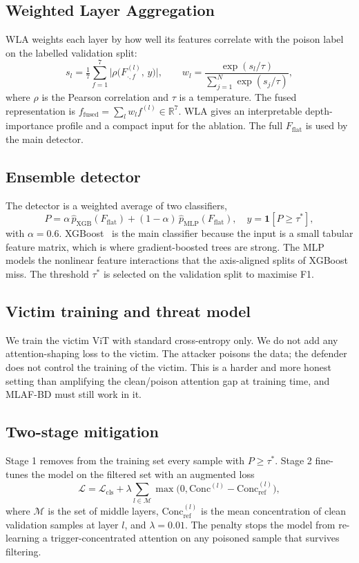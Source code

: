 \documentclass[journal]{IEEEtran}
\begin{document}
\subsection{Weighted Layer Aggregation}
WLA weights each layer by how well its features correlate with the poison label
on the labelled validation split:
\begin{equation}
s_l=\tfrac{1}{7}\textstyle\sum_{f=1}^{7}\big|\rho\big(F^{(l)}_{\cdot,f},\,y\big)\big|,
\qquad
w_l=\frac{\exp(s_l/\tau)}{\sum_{j=1}^{N}\exp(s_j/\tau)},
\end{equation}
where $\rho$ is the Pearson correlation and $\tau$ is a temperature. The fused
representation is $f_{\mathrm{fused}}=\sum_{l} w_l f^{(l)}\in\mathbb{R}^{7}$.
WLA gives an interpretable depth-importance profile and a compact input for the
ablation. The full $F_{\mathrm{flat}}$ is used by the main detector.

\subsection{Ensemble detector}
The detector is a weighted average of two classifiers,
\begin{equation}
P=\alpha\,\hat p_{\mathrm{XGB}}(F_{\mathrm{flat}})+(1-\alpha)\,\hat p_{\mathrm{MLP}}(F_{\mathrm{flat}}),\quad \hat y=\mathbf{1}[P\ge\tau^\ast],
\end{equation}
with $\alpha=0.6$. XGBoost~\cite{chen2016xgboost} is the main classifier because
the input is a small tabular feature matrix, which is where gradient-boosted
trees are strong. The MLP models the nonlinear feature interactions that the
axis-aligned splits of XGBoost miss. The threshold $\tau^\ast$ is selected on
the validation split to maximise F1.

\subsection{Victim training and threat model}
We train the victim ViT with standard cross-entropy only. We do not add any
attention-shaping loss to the victim. The attacker poisons the data; the
defender does not control the training of the victim. This is a harder and more
honest setting than amplifying the clean/poison attention gap at training time,
and MLAF-BD must still work in it.

\subsection{Two-stage mitigation}
Stage 1 removes from the training set every sample with $P\ge\tau^\ast$. Stage 2
fine-tunes the model on the filtered set with an augmented loss
\begin{equation}
\mathcal{L}=\mathcal{L}_{\mathrm{cls}}+\lambda\textstyle\sum_{l\in\mathcal{M}}\max\!\big(0,\mathrm{Conc}^{(l)}-\mathrm{Conc}^{(l)}_{\mathrm{ref}}\big),
\end{equation}
where $\mathcal{M}$ is the set of middle layers, $\mathrm{Conc}^{(l)}_{\mathrm{ref}}$
is the mean concentration of clean validation samples at layer $l$, and
$\lambda=0.01$. The penalty stops the model from re-learning a
trigger-concentrated attention on any poisoned sample that survives filtering.
\end{document}
